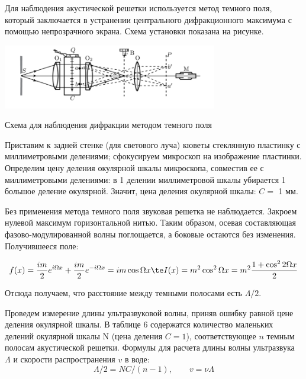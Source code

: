 Для наблюдения акустической решетки используется метод темного поля, который заключается в устранении центрального дифракционного максимума с помощью непрозрачного экрана. Схема установки показана на рисунке.

	\begin{center}

	\includegraphics[width=0.7\textwidth]{3.png}
	
	Схема для наблюдения дифракции методом темного поля
	\label{shema2}
\end{center}

Приставим к задней стенке (для светового луча) кюветы стеклянную пластинку с миллиметровыми делениями; сфокусируем микроскоп на изображение пластинки. Определим цену деления окулярной шкалы микроскопа, совместив ее с миллиметровыми делениями: в 1 делении миллиметровой шкалы убирается 1 большое деление окулярной. Значит, цена деления окулярной шкалы: $ C = $ 1 мм.

Без применения метода темного поля звуковая решетка не наблюдается. Закроем нулевой максимум горизонтальной нитью. Таким образом, осевая составляющая фазово-модулированной волны поглощается, а боковые остаются без изменения. Получившееся поле: 

\begin{equation}\label{}
f(x) = \dfrac{im}{2} e^{i\Omega x} +  \dfrac{im}{2} e^{-i\Omega x} = im \cos \Omega x \te I(x) = m^2 \cos ^2 \Omega x = m^2 \dfrac{1 + \cos ^2 2 \Omega x}{2}
\end{equation}

Отсюда получаем, что расстояние между темными полосами есть $ \Lambda/2 $.

\newpage

Проведем измерение длины ультразвуковой волны, приняв ошибку равной цене деления окулярной шкалы. В таблице 6 содержатся количество маленьких делений окулярной шкалы N (цена деления $ C = 1 $), соответствующее $ n $ темным полосам акустической решетки.
Формулы для расчета длины волны ультразвука $ \Lambda $ и скорости распространения $ v $ в воде:
\begin{equation}\label{}
\Lambda/2  = NC/(n - 1),  \qquad v = \nu\Lambda
\end{equation}

